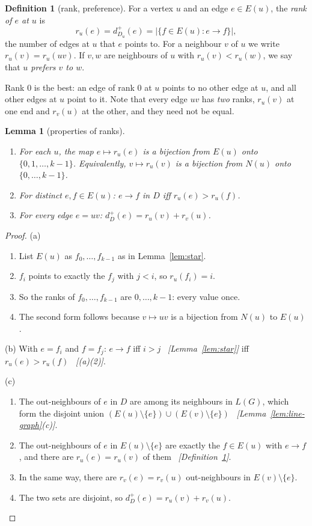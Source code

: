 \documentclass[11pt]{article}
\theoremstyle{plain}
\newtheorem{lemma}[theorem]{Lemma}
\theoremstyle{definition}
\newtheorem{definition}[theorem]{Definition}
\theoremstyle{remark}
\newcommand{\LG}{L(G)}
\newcommand{\st}[1]{E(#1)}
\newcommand{\dout}{d^{+}}
\newcommand{\why}[1]{\unskip\ \textit{[#1]}}
\newenvironment{steps}{\begin{enumerate}[label=(\arabic*),leftmargin=2.2em,itemsep=0.35em]}{\end{enumerate}}
\begin{document}
\begin{definition}[rank, preference]\label{def:rank}
For a vertex $u$ and an edge $e\in\st{u}$, the \emph{rank of $e$ at $u$} is
\[
  r_u(e)=\dout_{D_u}(e)=\bigl|\{f\in\st{u} : e\to f\}\bigr|,
\]
the number of edges at $u$ that $e$ points to. For a neighbour $v$ of $u$ we write
$r_u(v)=r_u(uv)$. If $v,w$ are neighbours of $u$ with $r_u(v)<r_u(w)$, we say that \emph{$u$
prefers $v$ to $w$}.
\end{definition}

Rank $0$ is the best: an edge of rank $0$ at $u$ points to no other edge at $u$, and all other
edges at $u$ point to it. Note that every edge $uv$ has \emph{two} ranks, $r_u(v)$ at one end and
$r_v(u)$ at the other, and they need not be equal.

\begin{lemma}[properties of ranks]\label{lem:rank}
\begin{enumerate}[label=(\alph*)]
  \item For each $u$, the map $e\mapsto r_u(e)$ is a bijection from $\st{u}$ onto
    $\{0,1,\dots,k-1\}$. Equivalently, $v\mapsto r_u(v)$ is a bijection from $N(u)$ onto
    $\{0,\dots,k-1\}$.
  \item For distinct $e,f\in\st{u}$: $e\to f$ in $D$ iff $r_u(e)>r_u(f)$.
  \item For every edge $e=uv$: $\dout_D(e)=r_u(v)+r_v(u)$.
\end{enumerate}
\end{lemma}

\begin{proof}
(a) \begin{steps}
  \item List $\st{u}$ as $f_0,\dots,f_{k-1}$ as in Lemma~\ref{lem:star}.
  \item $f_i$ points to exactly the $f_j$ with $j<i$, so $r_u(f_i)=i$.
  \item So the ranks of $f_0,\dots,f_{k-1}$ are $0,\dots,k-1$: every value once.
  \item The second form follows because $v\mapsto uv$ is a bijection from $N(u)$ to $\st{u}$.
\end{steps}

(b) With $e=f_i$ and $f=f_j$: $e\to f$ iff $i>j$ \why{Lemma~\ref{lem:star}} iff
$r_u(e)>r_u(f)$ \why{(a)(2)}.

(c) \begin{steps}
  \item The out-neighbours of $e$ in $D$ are among its neighbours in $\LG$, which form the
    disjoint union $(\st{u}\setminus\{e\})\cup(\st{v}\setminus\{e\})$
    \why{Lemma~\ref{lem:line-graph}(c)}.
  \item The out-neighbours of $e$ in $\st{u}\setminus\{e\}$ are exactly the $f\in\st{u}$ with
    $e\to f$, and there are $r_u(e)=r_u(v)$ of them \why{Definition~\ref{def:rank}}.
  \item In the same way, there are $r_v(e)=r_v(u)$ out-neighbours in $\st{v}\setminus\{e\}$.
  \item The two sets are disjoint, so $\dout_D(e)=r_u(v)+r_v(u)$. \qedhere
\end{steps}
\end{proof}
\end{document}
